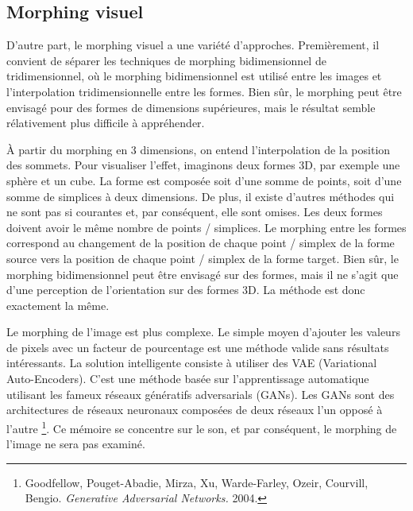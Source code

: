         
    \subsection{Morphing visuel}
    
D'autre part, le morphing visuel a une variété d'approches. Premièrement, il convient de séparer les techniques de morphing bidimensionnel de tridimensionnel, où le morphing bidimensionnel est utilisé entre les images et l’interpolation tridimensionnelle entre les formes. Bien sûr, le morphing peut être envisagé pour des formes de dimensions supérieures, mais le résultat semble rélativement plus difficile à appréhender.

À partir du morphing en 3 dimensions, on entend l'interpolation de la position des sommets. Pour visualiser l'effet, imaginons deux formes 3D, par exemple une sphère et un cube. La forme est composée soit d'une somme de points, soit d'une somme de simplices à deux dimensions. De plus, il existe d'autres méthodes qui ne sont pas si courantes et, par conséquent, elle sont omises. Les deux formes doivent avoir le même nombre de points / simplices. Le morphing entre les formes correspond au changement de la position de chaque point / simplex de la forme source vers la position de chaque point / simplex de la forme target. Bien sûr, le morphing bidimensionnel peut être envisagé sur des formes, mais il ne s'agit que d'une perception de l'orientation sur des formes 3D. La méthode est donc exactement la même.

Le morphing de l'image est plus complexe. Le simple moyen d’ajouter les valeurs de pixels avec un facteur de pourcentage est une méthode valide sans résultats intéressants. La solution intelligente consiste à utiliser des VAE (Variational Auto-Encoders). C'est une méthode basée sur l'apprentissage automatique utilisant les fameux réseaux génératifs adversarials (GANs). Les GANs sont des architectures de réseaux neuronaux composées de deux réseaux l’un opposé à l’autre \footnote{Goodfellow, Pouget-Abadie, Mirza, Xu, Warde-Farley, Ozeir, Courvill, Bengio. \textit{Generative Adversarial Networks.} 2004. \nocite{GANs}}. Ce mémoire se concentre sur le son, et par conséquent, le morphing de l'image ne sera pas examiné.


   
